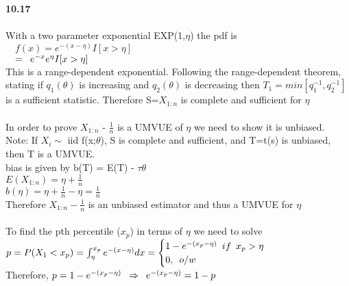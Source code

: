
{\bf 10.17}\\

\\

With a two parameter exponential EXP(1,$\eta$) the pdf is\\

$\quad f(x) = e^{-(x-\eta)}I[x > \eta]$ \\

$\quad = \enskip e^{-x}e^{\eta}I[x > \eta]$ \\

This is a range-dependent exponential. Following the range-dependent theorem, stating if $q_1(\theta)$ is increasing and $q_2(\theta)$ is decreasing then $T_1 = min[q_1^{-1},q_2^{-1}]$ is a sufficient statistic. Therefore S=$X_{1:n}$ is complete and sufficient for $\eta$ \\


\\

In order to prove $X_{1:n}$ - $\frac{1}{n}$ is a UMVUE of $\eta$ we need to show it is unbiased.\\
Note: If $X_i \sim$ iid f(x;$\theta$), S is complete and sufficient, and T=t(s) is unbiased, then T is a UMVUE.\\

bias is given by b(T) = E(T) - $\tau{\theta}$\\

$E(X_{1:n}) = \eta + \frac{1}{n}$\\

$b(\eta) = \eta + \frac{1}{n} - \eta = \frac{1}{n}$\\

Therefore $X_{1:n} - \frac{1}{n}$ is an unbiased estimator and thus a UMVUE for $\eta$ \\


 \\

To find the pth percentile ($x_p$) in terms of $\eta$ we need to solve\\

$ p= P(X_1 < x_p) = \int_{\eta}^{x_p} e^{-(x-\eta)} dx = \begin{cases} 1-e^{-(x_p - \eta)} \enskip if \enskip x_p > \eta \\
0, \enskip o/w \end{cases}$ \\

Therefore, $p=1-e^{-(x_p - \eta)} \enskip \Rightarrow \enskip e^{-(x_p - \eta)} = 1-p$\\

